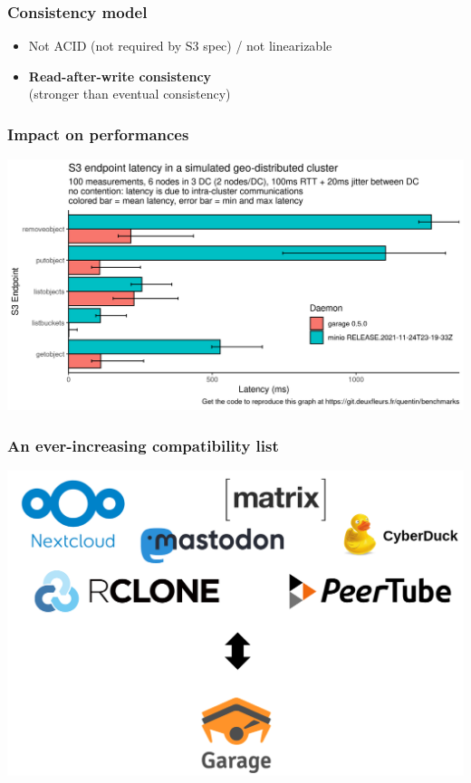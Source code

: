 \documentclass[aspectratio=169]{beamer}
\begin{document}
\begin{frame}
	\frametitle{Consistency model}
	\begin{itemize}
		\item Not ACID (not required by S3 spec) / not linearizable
			\vspace{1em}
		\item \textbf{Read-after-write consistency}\\
			{\footnotesize (stronger than eventual consistency)}
	\end{itemize}
\end{frame}

\begin{frame}
	\frametitle{Impact on performances}
		\begin{center}
			\includegraphics[width=.8\linewidth]{assets/endpoint-latency-dc.png}
		\end{center}
\end{frame}


\begin{frame}
	\frametitle{An ever-increasing compatibility list}
		\begin{center}
			\includegraphics[width=.7\linewidth]{assets/compatibility.png}
		\end{center}
\end{frame}
\end{document}
